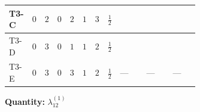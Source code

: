 \documentclass[8pt]{article}
\begin{document}
\begin{landscape}
\begin{longtable}{@{}llcccccc >{\raggedright\arraybackslash}p{0.21\linewidth} >{\raggedright\arraybackslash}p{0.21\linewidth} >{\raggedright\arraybackslash}p{0.21\linewidth}@{}}
\midrule
T3-C & $0$ & $2$ & $0$ & $2$ & $1$ & $3$ & $\frac{1}{2}$ & \scriptsize\adjustbox{max width=\linewidth}{$\begin{gathered} 3 {\lambda_5} \left({\lambda_5}\right)^{*}\end{gathered}$} & \scriptsize\adjustbox{max width=\linewidth}{$\begin{gathered} -9 {g_2}^2 {\lambda_{12}^{(1)}}\end{gathered}$} & \scriptsize\adjustbox{max width=\linewidth}{$\begin{gathered} -6 {g_1}^2 {\lambda_{12}^{(1)}}\end{gathered}$} \\
\midrule
T3-D & $0$ & $3$ & $0$ & $1$ & $1$ & $2$ & $\frac{1}{2}$ & \scriptsize\adjustbox{max width=\linewidth}{$\begin{gathered} 4 {\lambda_5} \left({\lambda_5}\right)^{*}\end{gathered}$} & \scriptsize\adjustbox{max width=\linewidth}{$\begin{gathered} -12 {g_2}^2 {\lambda_{12}^{(1)}}\end{gathered}$} & \scriptsize\adjustbox{max width=\linewidth}{$\begin{gathered} -6 {g_1}^2 {\lambda_{12}^{(1)}}\end{gathered}$} \\
\midrule
T3-E & $0$ & $3$ & $0$ & $3$ & $1$ & $2$ & $\frac{1}{2}$ & --- & --- & --- \\
\midrule
\bottomrule
\end{longtable}
\clearpage
\noindent\textbf{Quantity: }$\lambda_{12}^{(1)}$\par\smallskip

\end{landscape}
\end{document}
